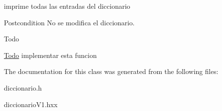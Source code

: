 imprime todas las entradas del diccionario 

\begin{DoxyPostcond}{Postcondition}
No se modifica el diccionario. 
\end{DoxyPostcond}
\begin{DoxyRefDesc}{Todo}
\item[\hyperlink{todo__todo000001}{Todo}]implementar esta funcion \end{DoxyRefDesc}


The documentation for this class was generated from the following files\-:\begin{DoxyCompactItemize}
\item 
diccionario.\-h\item 
diccionario\-V1.\-hxx\end{DoxyCompactItemize}

